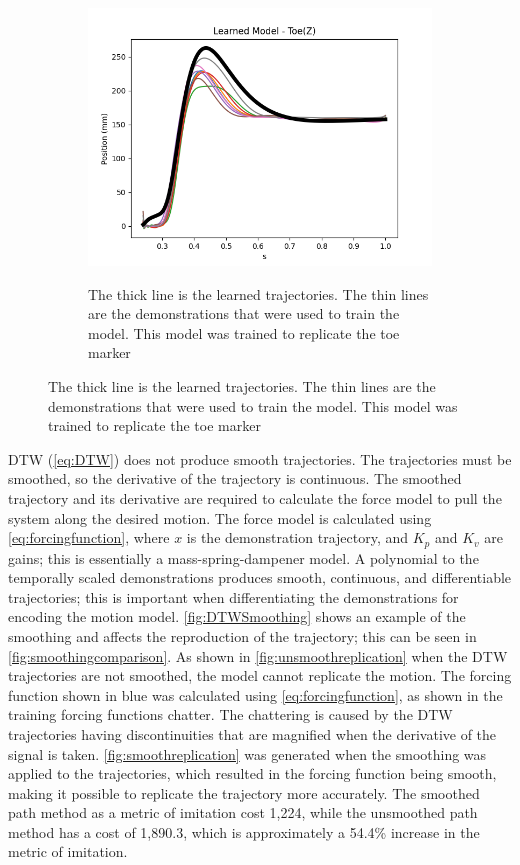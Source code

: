 \begin{figure}[h!]
\begin{subfigure}{0.4\linewidth}
{        \includegraphics[scale=0.50]{images/software/learnedZ.png}}
        \caption{The thick line is the learned trajectories. The thin lines are the demonstrations that were used to train the model. This model was trained to replicate the toe marker}
        \label{fig:learned}
    \end{subfigure}
    \label{fig:LFDexample}
\end{figure}


DTW (\autoref{eq:DTW}) does not produce smooth trajectories. The trajectories must be smoothed, so the derivative of the trajectory is continuous. The smoothed trajectory and its derivative are required to calculate the force model to pull the system along the desired motion. The force model is calculated using \autoref{eq:forcingfunction}, where $x$ is the demonstration trajectory, and $K_p$ and $K_v$ are gains; this is essentially a mass-spring-dampener model. A polynomial to the temporally scaled demonstrations produces smooth, continuous, and differentiable trajectories; this is important when differentiating the demonstrations for encoding the motion model.  \autoref{fig:DTWSmoothing} shows an example of the smoothing and affects the reproduction of the trajectory; this can be seen in \autoref{fig:smoothingcomparison}. As shown in \autoref{fig:unsmoothreplication} when the DTW trajectories are not smoothed, the model cannot replicate the motion. The forcing function shown in blue was calculated using \autoref{eq:forcingfunction}, as shown in the training forcing functions chatter. The chattering is caused by the DTW trajectories having discontinuities that are magnified when the derivative of the signal is taken.  \autoref{fig:smoothreplication} was generated when the smoothing was applied to the trajectories, which resulted in the forcing function being smooth, making it possible to replicate the trajectory more accurately. The smoothed path method as a metric of imitation cost 1,224, while the unsmoothed path method has a cost of 1,890.3, which is approximately a 54.4\% increase in the metric of imitation. 

